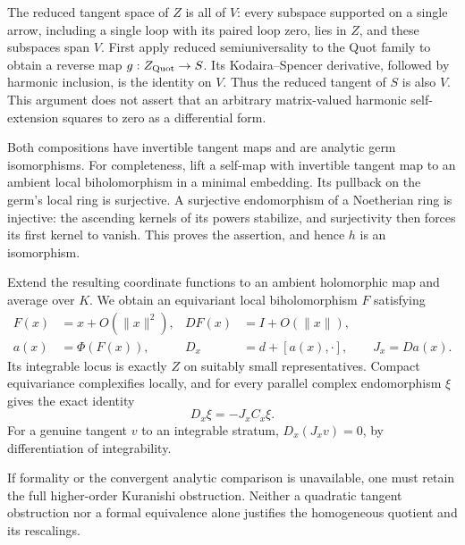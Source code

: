 The reduced tangent space of $Z$ is all of $V$: every subspace
supported on a single arrow, including a single loop with its
paired loop zero, lies in $Z$, and these subspaces span $V$.
First apply reduced semiuniversality to the Quot family to obtain
a reverse map $g:Z_{\rm Quot}\to S$. Its Kodaira--Spencer derivative,
followed by harmonic inclusion, is the identity on $V$.
Thus the reduced tangent of $S$ is also $V$.
This argument does not assert that an arbitrary matrix-valued
harmonic self-extension squares to zero as a differential form.

Both compositions have invertible tangent maps and are analytic
germ isomorphisms. For completeness, lift a self-map with invertible
tangent map to an ambient local biholomorphism in a minimal embedding.
Its pullback on the germ's local ring is surjective.
A surjective endomorphism of a Noetherian ring is injective:
the ascending kernels of its powers stabilize, and surjectivity
then forces its first kernel to vanish. This proves the assertion,
and hence $h$ is an isomorphism.

Extend the resulting coordinate functions to an ambient holomorphic
map and average over $K$. We obtain an equivariant local
biholomorphism $F$ satisfying
\begin{equation}\label{eq:ambient-coordinates}
 \begin{aligned}
 F(x)&=x+O(\|x\|^2),& DF(x)&=I+O(\|x\|),\\
 a(x)&=\Phi(F(x)),& D_x&=d+[a(x),\cdot],\qquad J_x=Da(x).
 \end{aligned}
\end{equation}
Its integrable locus is exactly $Z$ on suitably small representatives.
Compact equivariance complexifies locally, and for every parallel
complex endomorphism $\xi$ gives the exact identity
\begin{equation}\label{eq:exact-gauge-derivative}
 D_x\xi=-J_xC_x\xi.
\end{equation}
For a genuine tangent $v$ to an integrable stratum,
$D_x(J_xv)=0$, by differentiation of integrability.

If formality or the convergent analytic comparison is unavailable,
one must retain the full higher-order Kuranishi obstruction.
Neither a quadratic tangent obstruction nor a formal equivalence
alone justifies the homogeneous quotient and its rescalings.

